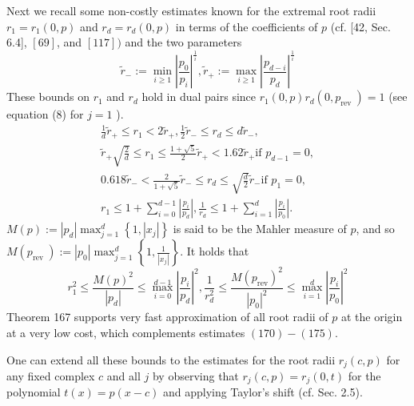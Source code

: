 \documentclass[sigconf]{acmart}
\begin{document}
Next we recall some non-costly estimates known for the extremal root radii $r_{1}=r_{1}(0, p)$ and $r_{d}=r_{d}(0, p)$ in terms of the coefficients of $p$ (cf. [42, Sec. 6.4], $[69]$, and $[117])$ and the two parameters
$$
\tilde{r}_{-}:=\min _{i \geq 1}\left|\frac{p_{0}}{p_{i}}\right|^{\frac{1}{i}}, \tilde{r}_{+}:=\max _{i \geq 1}\left|\frac{p_{d-i}}{p_{d}}\right|^{\frac{1}{i}}
$$
These bounds on $r_{1}$ and $r_{d}$ hold in dual pairs since $r_{1}(0, p) r_{d}\left(0, p_{\text {rev }}\right)=1$ (see equation (8) for $j=1$ ).
$$
\begin{gathered}
\frac{1}{d} \tilde{r}_{+} \leq r_{1}<2 \tilde{r}_{+}, \frac{1}{2} \tilde{r}_{-} \leq r_{d} \leq d \tilde{r}_{-}, \\
\tilde{r}_{+} \sqrt{\frac{2}{d}} \leq r_{1} \leq \frac{1+\sqrt{5}}{2} \tilde{r}_{+}<1.62 \tilde{r}_{+} \text {if } p_{d-1}=0, \\
0.618 \tilde{r}_{-}<\frac{2}{1+\sqrt{5}} \tilde{r}_{-} \leq r_{d} \leq \sqrt{\frac{d}{2}} \tilde{r}_{-} \text {if } p_{1}=0, \\
r_{1} \leq 1+\sum_{i=0}^{d-1}\left|\frac{p_{i}}{p_{d}}\right|, \frac{1}{r_{d}} \leq 1+\sum_{i=1}^{d}\left|\frac{p_{i}}{p_{0}}\right| .
\end{gathered}
$$
$M(p):=\left|p_{d}\right| \max _{j=1}^{d}\left\{1,\left|x_{j}\right|\right\}$ is said to be the Mahler measure of $p$, and so $M\left(p_{\text {rev }}\right):=\left|p_{0}\right| \max _{j=1}^{d}\left\{1, \frac{1}{\left|x_{j}\right|}\right\} .$ It holds that
$$
r_{1}^{2} \leq \frac{M(p)^{2}}{\left|p_{d}\right|} \leq \max _{i=0}^{d-1}\left|\frac{p_{i}}{p_{d}}\right|^{2}, \frac{1}{r_{d}^{2}} \leq \frac{M\left(p_{\mathrm{rev}}\right)^{2}}{\left|p_{0}\right|^{2}} \leq \max _{i=1}^{d}\left|\frac{p_{i}}{p_{0}}\right|^{2}
$$
Theorem 167 supports very fast approximation of all root radii of $p$ at the origin at a very low cost, which complements estimates $(170)-(175)$.


One can extend all these bounds to the estimates for the root radii $r_{j}(c, p)$ for any fixed complex $c$ and all $j$ by observing that $r_{j}(c, p)=r_{j}(0, t)$ for the polynomial $t(x)=p(x-c)$ and applying Taylor's shift (cf. Sec. 2.5).
\end{document}
